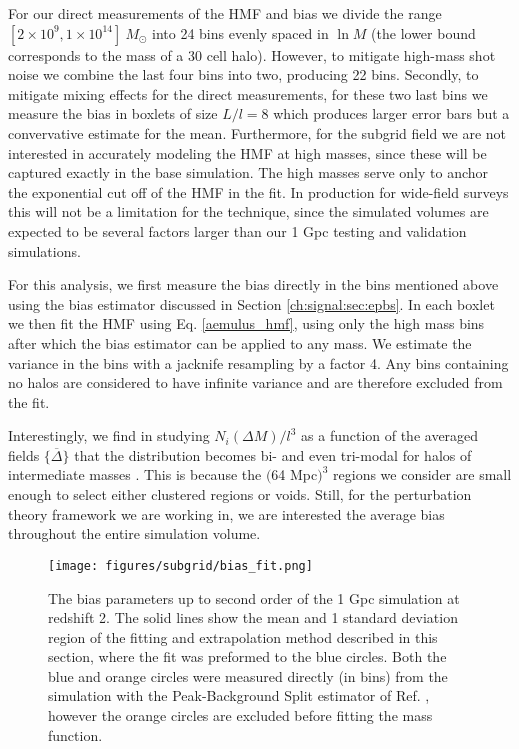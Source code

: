 For our direct measurements of the HMF and bias we divide the range $[2\times 10^9, 1\times 10^{14}]~M_\odot$ into 24 bins evenly spaced in $\ln{M}$ (the lower bound corresponds to the mass of a 30 cell halo). However, to mitigate high-mass shot noise we combine the last four bins into two, producing 22 bins. Secondly, to mitigate mixing effects for the direct measurements, for these two last bins we measure the bias in boxlets of size $L/l = 8$ which produces larger error bars but a convervative estimate for the mean. Furthermore, for the subgrid field we are not interested in accurately modeling the HMF at high masses, since these will be captured exactly in the base simulation. The high masses serve only to anchor the exponential cut off of the HMF in the fit. In production for wide-field surveys this will not be a limitation for the technique, since the simulated volumes are expected to be several factors larger than our 1 Gpc testing and validation simulations.

For this analysis, we first measure the bias directly in the bins mentioned above using the bias estimator discussed in Section \ref{ch:signal:sec:epbs}. In each boxlet we then fit the HMF using Eq. \ref{aemulus_hmf}, using only the high mass bins after which the bias estimator can be applied to any mass. We estimate the variance in the bins with a jacknife resampling by a factor 4. Any bins containing no halos are considered to have infinite variance and are therefore excluded from the fit.

Interestingly, we find in studying  $N_i(\Delta M)/l^3$ as a function of the averaged fields $\{\overline{\Delta}\}$ that the distribution becomes bi- and even tri-modal for halos of intermediate masses \citep{BAM}. This is because the $($64 Mpc$)^3$ regions we consider are small enough to select either clustered regions or voids. Still, for the perturbation theory framework we are working in, we are interested the average bias throughout the entire simulation volume.

\begin{figure} %
\begin{center}
\texttt{[image: figures/subgrid/bias\_fit.png]}%
\caption{The bias parameters up to second order of the 1 Gpc simulation at redshift 2. The solid lines show the mean and 1 standard deviation region of the fitting and extrapolation method described in this section, where the fit was preformed to the blue circles. Both the blue and orange circles were measured directly (in bins) from the simulation with the Peak-Background Split estimator of Ref. \citep{modietal2017}, however the orange circles are excluded before fitting the mass function.}
\label{bias_fit}
\end{center}
\end{figure}

